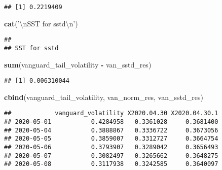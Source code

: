 \documentclass[]{article}
\newenvironment{Shaded}{\begin{snugshade}}{\end{snugshade}}
\newcommand{\CharTok}[1]{\textcolor[rgb]{0.31,0.60,0.02}{#1}}
\newcommand{\KeywordTok}[1]{\textcolor[rgb]{0.13,0.29,0.53}{\textbf{#1}}}
\newcommand{\NormalTok}[1]{#1}
\newcommand{\OperatorTok}[1]{\textcolor[rgb]{0.81,0.36,0.00}{\textbf{#1}}}
\newcommand{\StringTok}[1]{\textcolor[rgb]{0.31,0.60,0.02}{#1}}
\begin{document}
\begin{verbatim}
## [1] 0.2219409
\end{verbatim}

\begin{Shaded}
\begin{Highlighting}[]
\KeywordTok{cat}\NormalTok{(}\StringTok{'}\CharTok{\textbackslash{}n}\StringTok{SST for sstd}\CharTok{\textbackslash{}n}\StringTok{'}\NormalTok{)}
\end{Highlighting}
\end{Shaded}

\begin{verbatim}
## 
## SST for sstd
\end{verbatim}

\begin{Shaded}
\begin{Highlighting}[]
\KeywordTok{sum}\NormalTok{(vanguard_tail_volatility }\OperatorTok{-}\StringTok{ }\NormalTok{van_sstd_res)}
\end{Highlighting}
\end{Shaded}

\begin{verbatim}
## [1] 0.006310044
\end{verbatim}

\begin{Shaded}
\begin{Highlighting}[]
\KeywordTok{cbind}\NormalTok{(vanguard_tail_volatility, van_norm_res, van_sstd_res)}
\end{Highlighting}
\end{Shaded}

\begin{verbatim}
##            vanguard_volatility X2020.04.30 X2020.04.30.1
## 2020-05-01           0.4284958   0.3361028     0.3681400
## 2020-05-04           0.3888867   0.3336722     0.3673056
## 2020-05-05           0.3859007   0.3312727     0.3664754
## 2020-05-06           0.3793907   0.3289042     0.3656493
## 2020-05-07           0.3082497   0.3265662     0.3648275
## 2020-05-08           0.3117938   0.3242585     0.3640097
\end{verbatim}
\end{document}
